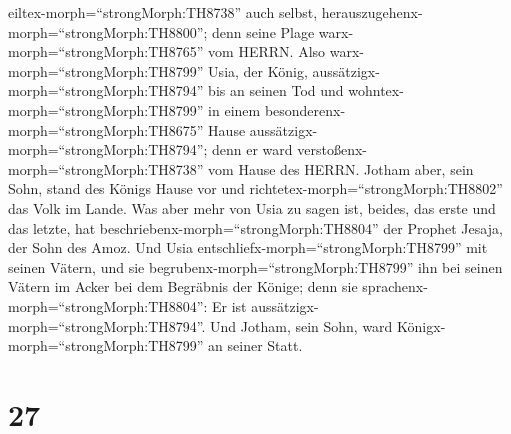 eiltex-morph=``strongMorph:TH8738'' auch selbst,
herauszugehenx-morph=``strongMorph:TH8800''; denn seine Plage
warx-morph=``strongMorph:TH8765'' vom HERRN.  Also
warx-morph=``strongMorph:TH8799'' Usia, der König,
aussätzigx-morph=``strongMorph:TH8794'' bis an seinen Tod und
wohntex-morph=``strongMorph:TH8799'' in einem
besonderenx-morph=``strongMorph:TH8675'' Hause
aussätzigx-morph=``strongMorph:TH8794''; denn er ward
verstoßenx-morph=``strongMorph:TH8738'' vom Hause des HERRN. Jotham
aber, sein Sohn, stand des Königs Hause vor und
richtetex-morph=``strongMorph:TH8802'' das Volk im Lande. 
Was aber mehr von Usia zu sagen ist, beides, das erste und das letzte,
hat beschriebenx-morph=``strongMorph:TH8804'' der Prophet Jesaja, der
Sohn des Amoz.  Und Usia
entschliefx-morph=``strongMorph:TH8799'' mit seinen Vätern, und sie
begrubenx-morph=``strongMorph:TH8799'' ihn bei seinen Vätern im Acker
bei dem Begräbnis der Könige; denn sie
sprachenx-morph=``strongMorph:TH8804'': Er ist
aussätzigx-morph=``strongMorph:TH8794''. Und Jotham, sein Sohn, ward
Königx-morph=``strongMorph:TH8799'' an seiner Statt.

\hypertarget{section-26}{%
\section{27}\label{section-26}}

